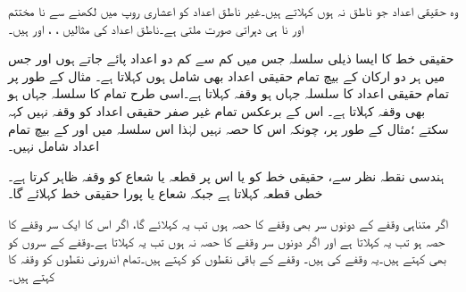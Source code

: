 وہ حقیقی اعداد جو ناطق نہ ہوں  کہلاتے ہیں۔غیر ناطق اعداد کو اعشاری روپ میں لکھنے سے نا مختتم اور نا ہی دہراتی صورت ملتی ہے۔ناطق اعداد  کی مثالیں ، ، اور  ہیں۔

حقیقی خط کا ایسا ذیلی سلسلہ جس میں کم سے کم دو اعداد پائے جاتے ہوں اور جس میں ہر دو ارکان کے بیچ تمام  حقیقی اعداد بھی  شامل ہوں  کہلاتا ہے۔ مثال کے طور  پر تمام حقیقی اعداد  کا سلسلہ جہاں  ہو وقفہ  کہلاتا ہے۔اسی طرح تمام  کا سلسلہ جہاں  ہو بھی وقفہ کہلاتا  ہے۔ اس کے برعکس تمام غیر صفر حقیقی اعداد کو  وقفہ نہیں  کہہ سکتے ؛مثال کے طور پر،  چونکہ  اس کا حصہ نہیں لہٰذا اس  سلسلہ میں    اور  کے بیچ تمام اعداد شامل نہیں۔

ہندسی نقطہ نظر سے،  حقیقی خط کو یا اس  پر قطعہ یا شعاع   کو وقفہ  ظاہر کرتا ہے۔خطی قطعہ  کہلاتا ہے  جبکہ شعاع یا پورا حقیقی خط  کہلائے گا۔

اگر متناہی وقفے  کے دونوں سر بھی وقفے   کا حصہ ہوں تب یہ  کہلائے گا، اگر اس کا ایک سر وقفے  کا حصہ ہو تب یہ  کہلاتا ہے اور اگر دونوں سر وقفے کا حصہ  نہ ہوں تب یہ  کہلاتا ہے۔وقفے کے سروں کو  بھی کہتے ہیں۔یہ وقفے  کی   ہیں۔ وقفے  کے باقی نقطوں کو  کہتے ہیں۔تمام اندرونی نقطوں کو وقفہ کا   کہتے ہیں۔

